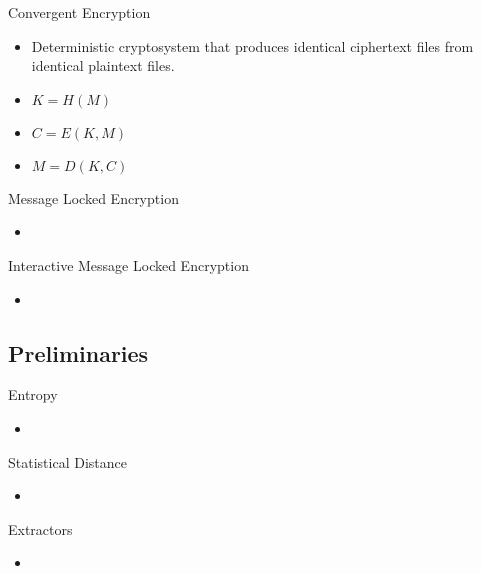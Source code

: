 \documentclass{beamer}
\begin{document}
\begin{frame}{Convergent Encryption}
	\begin{itemize}
		\setlength\itemsep{1em}
		\item Deterministic cryptosystem that produces  identical ciphertext files from identical plaintext files.
		\item $K = H(M)$
		\item $C = E(K, M)$
		\item $M = D(K,C)$
	\end{itemize}
\end{frame}

\begin{frame}{Message Locked Encryption}
	\begin{itemize}
		\setlength\itemsep{1em}
		\item 
	\end{itemize}
\end{frame}

\begin{frame}{Interactive Message Locked Encryption}
	\begin{itemize}
		\setlength\itemsep{1em}
		\item 
	\end{itemize}
\end{frame}

\subsection{Preliminaries}

\begin{frame}{Entropy}
	\begin{itemize}
		\setlength\itemsep{1em}
		\item 
	\end{itemize}
\end{frame}

\begin{frame}{Statistical Distance}
	\begin{itemize}
		\setlength\itemsep{1em}
		\item 
	\end{itemize}
\end{frame}

\begin{frame}{Extractors}
	\begin{itemize}
		\setlength\itemsep{1em}
		\item 
	\end{itemize}
\end{frame}
\end{document}
